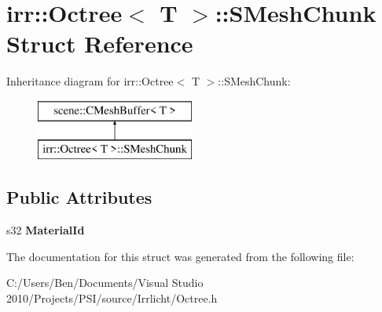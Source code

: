 \hypertarget{structirr_1_1_octree_1_1_s_mesh_chunk}{\section{irr\-:\-:Octree$<$ T $>$\-:\-:S\-Mesh\-Chunk Struct Reference}
\label{structirr_1_1_octree_1_1_s_mesh_chunk}
}
Inheritance diagram for irr\-:\-:Octree$<$ T $>$\-:\-:S\-Mesh\-Chunk\-:\begin{figure}[H]
\begin{center}
\leavevmode
\includegraphics[height=2.000000cm]{structirr_1_1_octree_1_1_s_mesh_chunk}
\end{center}
\end{figure}
\subsection*{Public Attributes}
\begin{DoxyCompactItemize}
\item 
\hypertarget{structirr_1_1_octree_1_1_s_mesh_chunk_abc02ba854d8f0d3ae87a449b5206bf6d}{s32 {\bfseries Material\-Id}}\label{structirr_1_1_octree_1_1_s_mesh_chunk_abc02ba854d8f0d3ae87a449b5206bf6d}

\end{DoxyCompactItemize}


The documentation for this struct was generated from the following file\-:\begin{DoxyCompactItemize}
\item 
C\-:/\-Users/\-Ben/\-Documents/\-Visual Studio 2010/\-Projects/\-P\-S\-I/source/\-Irrlicht/Octree.\-h\end{DoxyCompactItemize}
